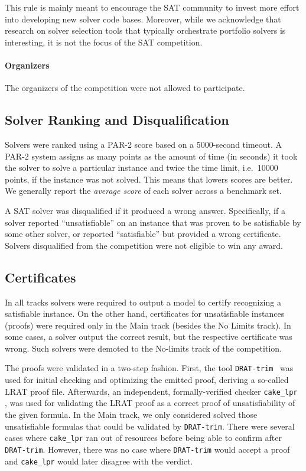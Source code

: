\documentclass{elsarticle}
\begin{document}
This rule is mainly meant to encourage the SAT community to invest more effort into developing new solver code bases.
Moreover, while we acknowledge that research on solver selection tools that typically orchestrate portfolio solvers 
is interesting, it is not the focus of the SAT competition.


\paragraph{Organizers}
The organizers of the competition were not allowed to participate.

\subsection{Solver Ranking and Disqualification}

Solvers were ranked using a PAR-2 score based on a \num{5000}-second timeout.
A PAR-2 system assigns as many points as the amount of time (in seconds) it took the solver
to solve a particular instance and twice the time limit, i.e.~\num{10000} points,
if the instance was not solved. This means that lowers scores are better.
We generally report the \emph{average score} of each solver across a benchmark set.

A SAT solver was disqualified if it produced a wrong answer. 
Specifically, if a solver reported ``unsatisfiable'' on an instance that 
was proven to be satisfiable by some other solver, or reported ``satisfiable'' 
but provided a wrong certificate. Solvers disqualified from the competition were
not eligible to win any award. 

\subsection{Certificates}

\label{sec:certif}

In all tracks solvers were required to output a model to certify recognizing a satisfiable instance.
On the other hand, 
certificates for unsatisfiable instances (proofs) were required only 
in the Main track (besides the No Limits track).
In some cases, a solver output the correct result, but the respective certificate was wrong. 
Such solvers were demoted to the No-limits track of the competition. 

The proofs were validated in a two-step fashion. First, the tool {\tt DRAT-trim}~\cite{DRATtrim}
was used for initial checking and optimizing the emitted proof, deriving a so-called LRAT proof file.
Afterwards, an independent, formally-verified checker {\tt cake\_lpr} \cite{cakeLprGithub}, 
was used for validating the LRAT proof as a correct proof of unsatisfiability of the given formula.
In the Main track, we only considered solved those unsatisfiable formulas that 
could be validated by {\tt DRAT-trim}.
There were several cases where {\tt cake\_lpr} ran out of resources before being able to 
confirm after {\tt DRAT-trim}. However, there was no case where {\tt DRAT-trim} would accept
a proof and {\tt cake\_lpr} would later disagree with the verdict.
\end{document}

